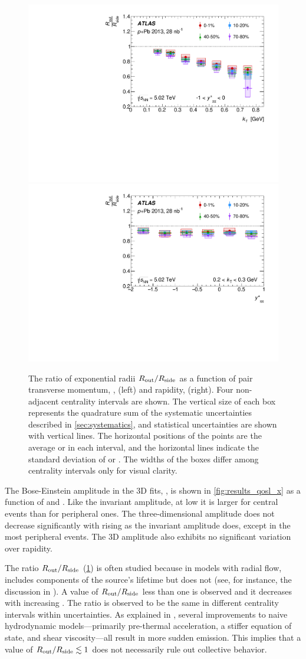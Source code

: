 \begin{figure}[t]
\centering
\includegraphics[width=0.49\linewidth]{canqosl_RoutOverRside_vs_kt.pdf}
\includegraphics[width=0.49\linewidth]{canqosl_RoutOverRside_vs_kys.pdf}
\caption{The ratio of exponential radii $R_{\mathrm{out}}/R_{\mathrm{side}}$ as a function of pair transverse momentum, \kt, (left) and rapidity, \kys (right). Four non-adjacent centrality intervals are shown. The vertical size of each box represents the quadrature sum of the systematic uncertainties described in \cref{sec:systematics}, and statistical uncertainties are shown with vertical lines. The horizontal positions of the points are the average \kt or \kys in each interval, and the horizontal lines indicate the standard deviation of \kt or \kys. The widths of the boxes differ among centrality intervals only for visual clarity.}
\label{fig:results_RoutOverRside_kt}
\end{figure}

The Bose-Einstein amplitude in the 3D fits, \losl, is shown in \cref{fig:results_qosl_x} as a function of \kt and \kys. Like the invariant amplitude, at low \kt it is larger for central events than for peripheral ones. The three-dimensional amplitude does not decrease significantly with rising \kt as the invariant amplitude does, except in the most peripheral events. The 3D amplitude also exhibits no significant variation over rapidity.

The ratio $R_{\mathrm{out}}/R_{\mathrm{side}}$ (\cref{fig:results_RoutOverRside_kt}) is often studied because in models with radial flow, \Rout includes components of the source's lifetime but \Rside does not (see, for instance, the discussion in ).
A value of $R_{\mathrm{out}}/R_{\mathrm{side}}$ less than one is observed and it decreases with increasing \kt.
The ratio is observed to be the same in different centrality intervals within uncertainties.
As explained in , several improvements to naive hydrodynamic models---primarily pre-thermal acceleration, a stiffer equation of state, and shear viscosity---all result in more sudden emission.
This implies that a value of $R_{\mathrm{out}}/R_{\mathrm{side}} \lesssim 1$ does not necessarily rule out collective behavior.

